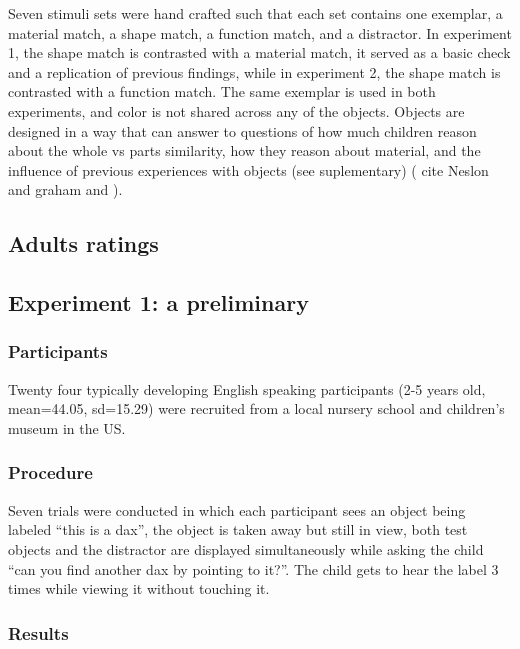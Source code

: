 \documentclass[10pt, letterpaper]{article}
\begin{document}
Seven stimuli sets were hand crafted such that each set contains one
exemplar, a material match, a shape match, a function match, and a
distractor. In experiment 1, the shape match is contrasted with a
material match, it served as a basic check and a replication of previous
findings, while in experiment 2, the shape match is contrasted with a
function match. The same exemplar is used in both experiments, and color
is not shared across any of the objects. Objects are designed in a way
that can answer to questions of how much children reason about the whole
vs parts similarity, how they reason about material, and the influence
of previous experiences with objects (see suplementary) ( cite Neslon
and graham and ).

\hypertarget{adults-ratings}{%
\subsection{Adults ratings}\label{adults-ratings}}

\hypertarget{experiment-1-a-preliminary}{%
\subsection{Experiment 1: a
preliminary}\label{experiment-1-a-preliminary}}

\hypertarget{participants}{%
\subsubsection{Participants}\label{participants}}

Twenty four typically developing English speaking participants (2-5
years old, mean=44.05, sd=15.29) were recruited from a local nursery
school and children's museum in the US.

\hypertarget{procedure}{%
\subsubsection{Procedure}\label{procedure}}

Seven trials were conducted in which each participant sees an object
being labeled ``this is a dax'', the object is taken away but still in
view, both test objects and the distractor are displayed simultaneously
while asking the child ``can you find another dax by pointing to it?''.
The child gets to hear the label 3 times while viewing it without
touching it.

\hypertarget{results}{%
\subsubsection{Results}\label{results}}
\end{document}

